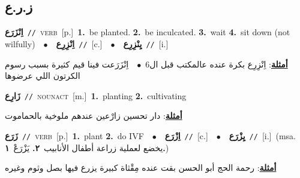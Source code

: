 \documentclass[10pt,a4paper,twoside]{article} %
\begin{document}
\begin{multicols}{2}
\vspace{-3mm}
\subsection*{\color{blue}\foreignlanguage{arabic}{ز.ر.ع}\color{blue}{}} 

{\setlength\topsep{0pt}\textbf{\foreignlanguage{arabic}{اِنْزَرَع}}\ {\color{gray}\texttt{//}\color{black}}\ \textsc{verb}\ [p.]\ \textbf{1.}~be planted.  \textbf{2.}~be inculcated.  \textbf{3.}~wait  \textbf{4.}~sit down (not wilfully)\ \ $\bullet$\ \ \setlength\topsep{0pt}\textbf{\foreignlanguage{arabic}{اِنْزِرِع}}\ {\color{gray}\texttt{//}\color{black}}\ [c.]\ \ $\bullet$\ \ \setlength\topsep{0pt}\textbf{\foreignlanguage{arabic}{يِنْزِرِع}}\ {\color{gray}\texttt{//}\color{black}}\ [i.]\  \begin{flushright}\color{gray}\foreignlanguage{arabic}{\textbf{\underline{\foreignlanguage{arabic}{أمثلة}}}: اِنْزِرِع بكرة عنده عالمكتب قبل ال6\ $\bullet$\ \  اِنْزَرَعت فينا قيم كثيرة بسبب رسوم الكرتون اللي عرضوها}\end{flushright}\color{black}} \vspace{2mm}

{\setlength\topsep{0pt}\textbf{\foreignlanguage{arabic}{زَارِع}}\ {\color{gray}\texttt{//}\color{black}}\ \textsc{noun\textunderscore act}\ [m.]\ \textbf{1.}~planting  \textbf{2.}~cultivating\  \begin{flushright}\color{gray}\foreignlanguage{arabic}{\textbf{\underline{\foreignlanguage{arabic}{أمثلة}}}: دار تحسين زارْعين عندهم ملوخية بالحماموت}\end{flushright}\color{black}} \vspace{2mm}

{\setlength\topsep{0pt}\textbf{\foreignlanguage{arabic}{زَرَع}}\ {\color{gray}\texttt{//}\color{black}}\ \textsc{verb}\ [p.]\ \textbf{1.}~plant  \textbf{2.}~do IVF\ \ $\bullet$\ \ \setlength\topsep{0pt}\textbf{\foreignlanguage{arabic}{اِزْرَع}}\ {\color{gray}\texttt{//}\color{black}}\ [c.]\ \ $\bullet$\ \ \setlength\topsep{0pt}\textbf{\foreignlanguage{arabic}{يِزْرَع}}\ {\color{gray}\texttt{//}\color{black}}\ [i.]\ \color{gray}(msa. \foreignlanguage{arabic}{يخضع لعملية زراعة أطفال الأنابيب}~\foreignlanguage{arabic}{\textbf{٢.}}  \foreignlanguage{arabic}{يَزْرَعْ}~\foreignlanguage{arabic}{\textbf{١.}})\color{black}\  \begin{flushright}\color{gray}\foreignlanguage{arabic}{\textbf{\underline{\foreignlanguage{arabic}{أمثلة}}}: رحمة الحج أبو الحسن بقت عنده مِقْثاة كبيرة يزرع فيها بصل وثوم وغيره}\end{flushright}\color{black}} \vspace{2mm}


\end{multicols}
\end{document}
